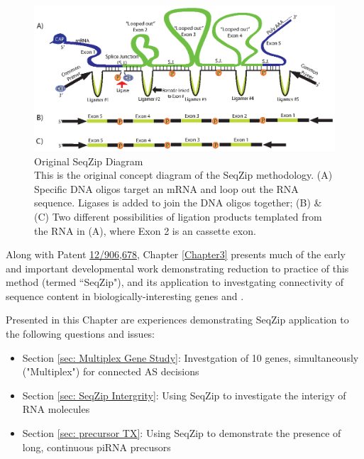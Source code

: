   \begin{figure}[htbp] %
    \centering 
    \includegraphics{Figures/Chapter2/OriginalSeqZipDiagram.eps}
    \caption[Original SeqZip Diagram]
    {
      Original SeqZip Diagram\\
      This is the original concept diagram of the SeqZip methodology. (A) Specific DNA oligos target an mRNA and loop out the RNA sequence. Ligases is added to join the DNA oligos together; (B) \& (C) Two different possibilities of ligation products templated from the RNA in (A), where Exon 2 is an cassette exon.
    	}
    \label{fig:Original SeqZip Diagram}
  	\end{figure}

  Along with Patent \href{http://1.usa.gov/PTG9BB}{12/906,678}, Chapter \ref{Chapter3} presents much of the early and important developmental work demonstrating reduction to practice of this method (termed ``SeqZip"), and its application to investgating connectivity of sequence content in biologically-interesting genes \fn{} and \dscam{}. 

  Presented in this Chapter are experiences demonstrating SeqZip application to the following questions and issues:

  \begin{itemize} %
    \item Section \ref{sec: Multiplex Gene Study}: Investgation of 10 genes, simultaneously ("Multiplex") for connected AS decisions
    \item Section \ref{sec: SeqZip Intergrity}: Using SeqZip to investigate the interigy of RNA molecules
     \item Section \ref{sec: precursor TX}: Using SeqZip to demonstrate the presence of long, continuous piRNA precusors
	  \end{itemize}

